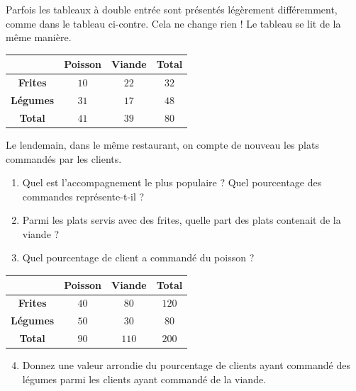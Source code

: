 \documentclass[11pt]{article}
\begin{document}
\begin{rmq}
  \begin{minipage}{.5\textwidth}
  Parfois les tableaux à double entrée sont présentés légèrement différemment,
  comme dans le tableau ci-contre. Cela ne change rien ! Le tableau se lit de la
  même manière.
  \end{minipage}
  \begin{minipage}{.5\textwidth}
\begin{center}
\renewcommand{\arraystretch}{2}
\begin{tabular}{cccc}
  \toprule
  & \textbf{Poisson} & \textbf{Viande} & \textbf{Total} \\ \midrule
  \textbf{Frites} & $10$ & $22$ & $32$ \\
  \textbf{Légumes} & $31$ & $17$ & $48$ \\
  \textbf{Total} & $41$ & $39$ & $80$ \\ \bottomrule
\end{tabular}
\end{center}
\end{minipage}
\end{rmq}

\begin{exemple}
  \begin{minipage}{.5\textwidth}
    Le lendemain, dans le même restaurant, on compte de nouveau les plats
    commandés par les clients.
    \begin{enumerate}
      \item Quel est l'accompagnement le plus populaire ? Quel pourcentage
        des commandes représente-t-il ?
      \item Parmi les plats servis avec des frites, quelle part des plats
        contenait de la viande ?
      \item Quel pourcentage de client a commandé du poisson ?
    \end{enumerate}
  \end{minipage}
  \begin{minipage}{.5\textwidth}
\begin{center}
\renewcommand{\arraystretch}{2}
\begin{tabular}{|c|c|c|c|}
  \cline{2-4}
  \multicolumn{1}{c|}{} & \textbf{Poisson} & \textbf{Viande} & \textbf{Total} \\
  \hline
  \textbf{Frites} & $40$ & $80$ & $120$ \\
  \hline
  \textbf{Légumes} & $50$ & $30$ & $80$ \\
  \hline
  \textbf{Total} & $90$ & $110$ & $200$ \\
  \hline
\end{tabular}
\end{center}
  \end{minipage}
  \begin{enumerate}
      \setcounter{enumi}{3}
    \item Donnez une valeur arrondie du pourcentage de clients ayant commandé
      des légumes parmi les clients ayant commandé de la viande.
  \end{enumerate}
\end{exemple}
\end{document}
